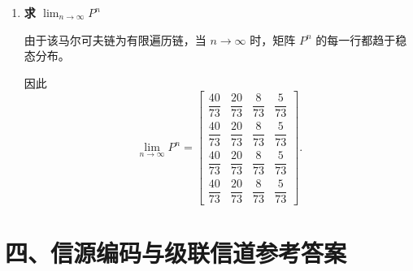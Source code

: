 \documentclass[UTF8,a4paper,12pt]{ctexart}
\begin{document}
\begin{enumerate}[label=\arabic*., leftmargin=2.2em]
所以
\[
\boxed{
H_{\infty}
\approx
0.9302\ \text{bit/符号}
}.
\]


\item \textbf{求 $\displaystyle\lim_{n\to\infty}P^n$}

由于该马尔可夫链为有限遍历链，当 $n\to\infty$ 时，矩阵 $P^n$ 的每一行都趋于稳态分布。

因此
\[
\boxed{
\lim_{n\to\infty}P^n
=
\begin{bmatrix}
\dfrac{40}{73}&\dfrac{20}{73}&\dfrac{8}{73}&\dfrac{5}{73}\\[0.5em]
\dfrac{40}{73}&\dfrac{20}{73}&\dfrac{8}{73}&\dfrac{5}{73}\\[0.5em]
\dfrac{40}{73}&\dfrac{20}{73}&\dfrac{8}{73}&\dfrac{5}{73}\\[0.5em]
\dfrac{40}{73}&\dfrac{20}{73}&\dfrac{8}{73}&\dfrac{5}{73}
\end{bmatrix}
}.
\]

\end{enumerate}


\newpage

\section*{四、信源编码与级联信道参考答案}
\end{document}
